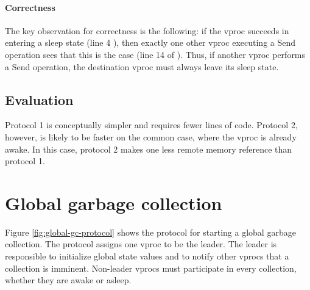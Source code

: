 \documentclass[11pt]{article}
\begin{document}
\paragraph{Correctness}
The key observation for correctness is the following: if the vproc succeeds in 
entering a sleep state (line 4 ), then exactly one other vproc executing a Send operation sees 
that this is the case (line 14 of ).
Thus, if another vproc performs a Send operation, the destination vproc must always
leave its sleep state.

\subsection{Evaluation}\label{sec:evaluation}
Protocol 1 is conceptually simpler and requires fewer lines of code.
Protocol 2, however, is likely to be faster on the common case, where the vproc is
already awake.
In this case, protocol 2 makes one less remote memory reference than protocol 1.

\section{Global garbage collection}\label{sec:global-gc}
Figure \ref{fig:global-gc-protocol} shows the protocol for starting a global garbage
collection.
The protocol assigns one vproc to be the leader.
The leader is responsible to initialize global state values and to notify other vprocs
that a collection is imminent.
Non-leader vprocs must participate in every collection, whether they are awake or asleep.
\end{document}
